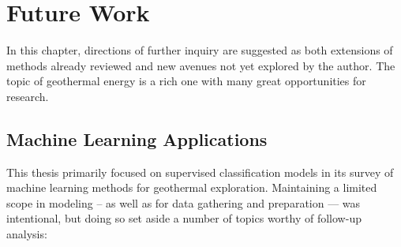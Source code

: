 \chapter{Future Work}
\label{ch9:future_work}

In this chapter, directions of further inquiry are suggested as both extensions of methods already reviewed and new avenues not yet explored by the author. The topic of geothermal energy is a rich one with many great opportunities for research.

\section{Machine Learning Applications}\label{ch9:future_work_ml}

This thesis primarily focused on supervised classification models in its survey of machine learning methods for geothermal exploration. Maintaining a limited scope in modeling -- as well as for data gathering and preparation --- was intentional, but doing so set aside a number of topics worthy of follow-up analysis:

